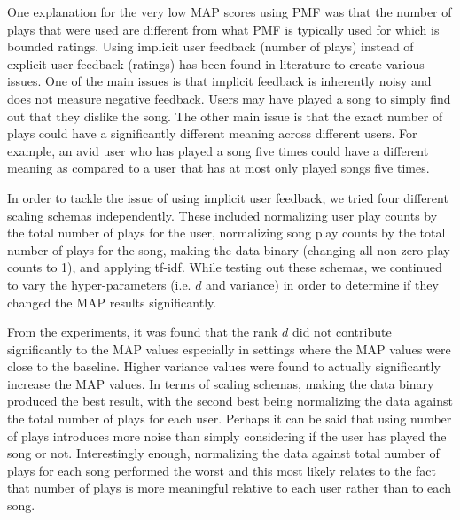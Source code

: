 \documentclass[11pt,preprint]{aastex}
\begin{document}
One explanation for the very low MAP scores using PMF was that the number of plays that were used are different from what PMF is typically used for which is bounded ratings. Using implicit user feedback (number of plays) instead of explicit user feedback (ratings) has been found in literature to create various issues. One of the main issues is that implicit feedback is inherently noisy and does not measure negative feedback. Users may have played a song to simply find out that they dislike the song. The other main issue is that the exact number of plays could have a significantly different meaning across different users. For example, an avid user who has played a song five times could have a different meaning as compared to a user that has at most only played songs five times.
 
In order to tackle the issue of using implicit user feedback, we tried four different scaling schemas independently. These included normalizing user play counts by the total number of plays for the user, normalizing song play counts by the total number of plays for the song, making the data binary (changing all non-zero play counts to 1), and  applying tf-idf. While testing out these schemas, we continued to vary the hyper-parameters (i.e. $d$ and variance) in order to determine if they changed the MAP results significantly. 
 
From the experiments, it was found that the rank $d$ did not contribute significantly to the MAP values especially in settings where the MAP values were close to the baseline. Higher variance values were found to actually significantly increase the MAP values. In terms of scaling schemas, making the data binary produced the best result, with the second best being normalizing the data against the total number of plays for each user. Perhaps it can be said that using number of plays introduces more noise than simply considering if the user has played the song or not. Interestingly enough, normalizing the data against total number of plays for each song performed the worst and this most likely relates to the fact that number of plays is more meaningful relative to each user rather than to each song.
 
\end{document}
